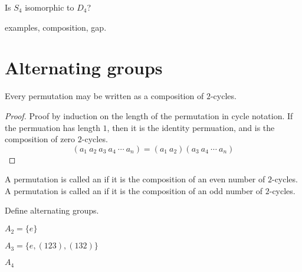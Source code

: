 \documentclass{ximera}
\begin{document}
\begin{exercise}
  Is $S_4$ isomorphic to $D_4$?
\end{exercise}

examples, composition, gap.

\section{Alternating groups}

\begin{lemma}
  Every permutation may be written as a composition of $2$-cycles.
  \begin{proof}
    Proof by induction on the length of the permutation in cycle
    notation. If the permuation has length $1$, then it is the
    identity permuation, and is the composition of zero $2$-cycles.
    \[
    (a_1 \ a_2 \ a_3 \ a_4 \ \cdots\ a_n) =   (a_1 \ a_2) (a_3 \ a_4 \ \cdots\ a_n)
    \]
  \end{proof}
\end{lemma}

\begin{definition}
  A permutation is called an  if it is the
  composition of an even number of $2$-cycles. A permutation is called
  an  if it is the composition of an odd number
  of $2$-cycles.
\end{definition}


Define alternating groups.

$A_2 = \{e\}$

$A_3 = \{e,(123), (132)\}$


$A_4$
\end{document}
